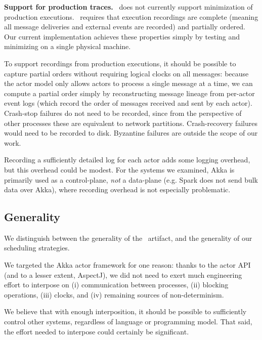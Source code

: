 \noindent\textbf{Support for production traces.} \sys~does not currently
support minimization of production executions.
\sys~requires that execution recordings are complete (meaning all message
deliveries and external events are recorded) and partially ordered. Our
current implementation
achieves these properties simply by testing and minimizing on a single
physical machine.

To support recordings from production executions, it should be possible to
capture partial orders without requiring logical clocks on all messages:
because the actor model only allows actors to process a
single message at a time, we can compute a partial order simply by
reconstructing message lineage from per-actor event logs (which record the order
of messages received and sent by each actor).
Crash-stop
failures do not need to be recorded, since from the perspective of other
processes these are equivalent to network partitions. Crash-recovery failures
would need to be recorded to disk. Byzantine failures are outside the scope of
our work.

Recording a sufficiently detailed log for each actor adds
some logging overhead, but this overhead could be modest. For the systems
we examined, Akka is primarily used as a control-plane, {\em not} a
data-plane (e.g. Spark does not send bulk data over Akka), where
recording overhead is not especially problematic.


\subsection{Generality}
\label{subsec:generality}

We distinguish between the generality of the
\sys~artifact, and the generality of our scheduling strategies.

 We targeted the Akka actor framework
for one reason: thanks to the actor API (and to a lesser extent, AspectJ), we did not need to exert much
engineering effort to interpose on (i) communication
between processes, (ii) blocking operations, (iii) clocks, and (iv) remaining sources of non-determinism.

We believe that with enough interposition, it should be possible to
sufficiently control other systems, regardless of language or
programming model. That said, the effort needed to interpose could certainly be
significant.

